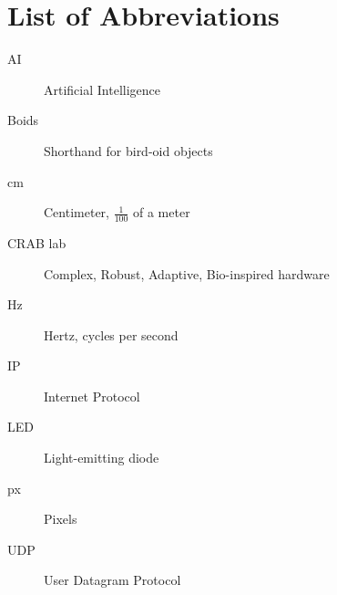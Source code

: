 \chapter{List of Abbreviations}

\begin{description}
  \item[AI] Artificial Intelligence
  \item[Boids] Shorthand for bird-oid objects
  \item[cm] Centimeter, $\frac{1}{100}$ of a meter
  \item[CRAB lab] Complex, Robust, Adaptive, Bio-inspired hardware
  \item[Hz] Hertz, cycles per second
  \item[IP] Internet Protocol
  \item[LED] Light-emitting diode
  \item[px] Pixels
  \item[UDP] User Datagram Protocol
\end{description}
